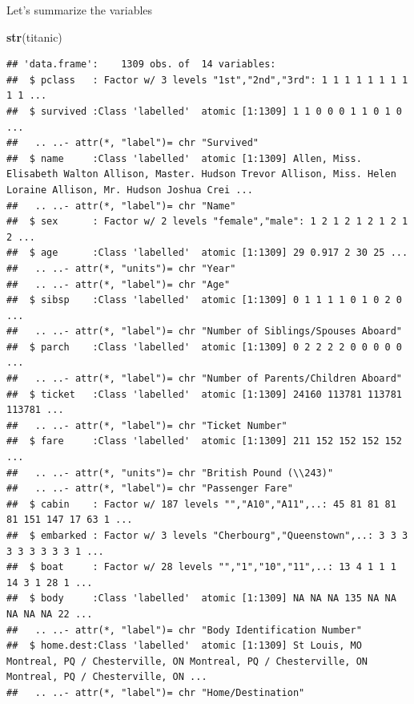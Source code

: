 \documentclass[12,]{article}
\newenvironment{Shaded}{\begin{snugshade}}{\end{snugshade}}
\newcommand{\KeywordTok}[1]{\textcolor[rgb]{0.13,0.29,0.53}{\textbf{{#1}}}}
\newcommand{\NormalTok}[1]{{#1}}
\begin{document}
Let's summarize the variables

\begin{Shaded}
\begin{Highlighting}[]
\KeywordTok{str}\NormalTok{(titanic)}
\end{Highlighting}
\end{Shaded}

\begin{verbatim}
## 'data.frame':    1309 obs. of  14 variables:
##  $ pclass   : Factor w/ 3 levels "1st","2nd","3rd": 1 1 1 1 1 1 1 1 1 1 ...
##  $ survived :Class 'labelled'  atomic [1:1309] 1 1 0 0 0 1 1 0 1 0 ...
##   .. ..- attr(*, "label")= chr "Survived"
##  $ name     :Class 'labelled'  atomic [1:1309] Allen, Miss. Elisabeth Walton Allison, Master. Hudson Trevor Allison, Miss. Helen Loraine Allison, Mr. Hudson Joshua Crei ...
##   .. ..- attr(*, "label")= chr "Name"
##  $ sex      : Factor w/ 2 levels "female","male": 1 2 1 2 1 2 1 2 1 2 ...
##  $ age      :Class 'labelled'  atomic [1:1309] 29 0.917 2 30 25 ...
##   .. ..- attr(*, "units")= chr "Year"
##   .. ..- attr(*, "label")= chr "Age"
##  $ sibsp    :Class 'labelled'  atomic [1:1309] 0 1 1 1 1 0 1 0 2 0 ...
##   .. ..- attr(*, "label")= chr "Number of Siblings/Spouses Aboard"
##  $ parch    :Class 'labelled'  atomic [1:1309] 0 2 2 2 2 0 0 0 0 0 ...
##   .. ..- attr(*, "label")= chr "Number of Parents/Children Aboard"
##  $ ticket   :Class 'labelled'  atomic [1:1309] 24160 113781 113781 113781 ...
##   .. ..- attr(*, "label")= chr "Ticket Number"
##  $ fare     :Class 'labelled'  atomic [1:1309] 211 152 152 152 152 ...
##   .. ..- attr(*, "units")= chr "British Pound (\\243)"
##   .. ..- attr(*, "label")= chr "Passenger Fare"
##  $ cabin    : Factor w/ 187 levels "","A10","A11",..: 45 81 81 81 81 151 147 17 63 1 ...
##  $ embarked : Factor w/ 3 levels "Cherbourg","Queenstown",..: 3 3 3 3 3 3 3 3 3 1 ...
##  $ boat     : Factor w/ 28 levels "","1","10","11",..: 13 4 1 1 1 14 3 1 28 1 ...
##  $ body     :Class 'labelled'  atomic [1:1309] NA NA NA 135 NA NA NA NA NA 22 ...
##   .. ..- attr(*, "label")= chr "Body Identification Number"
##  $ home.dest:Class 'labelled'  atomic [1:1309] St Louis, MO Montreal, PQ / Chesterville, ON Montreal, PQ / Chesterville, ON Montreal, PQ / Chesterville, ON ...
##   .. ..- attr(*, "label")= chr "Home/Destination"
\end{verbatim}
\end{document}
